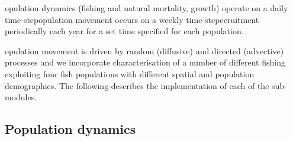 \documentclass[review]{elsarticle}
\begin{document}
opulation dynamics (fishing and natural mortality,
growth) operate on a daily time-stepopulation
movement occurs on a weekly time-stepecruitment
 periodically each year for a set time
 specified for each
population.  

opulation movement is driven by
random (diffusive) and directed (advective) processes and we incorporate
characterisation of a number of different fishing 
exploiting four fish populations with different spatial and population
demographics. The following describes the implementation of each of the
sub-modules.

\clearpage


\subsection{Population dynamics}
\end{document}
